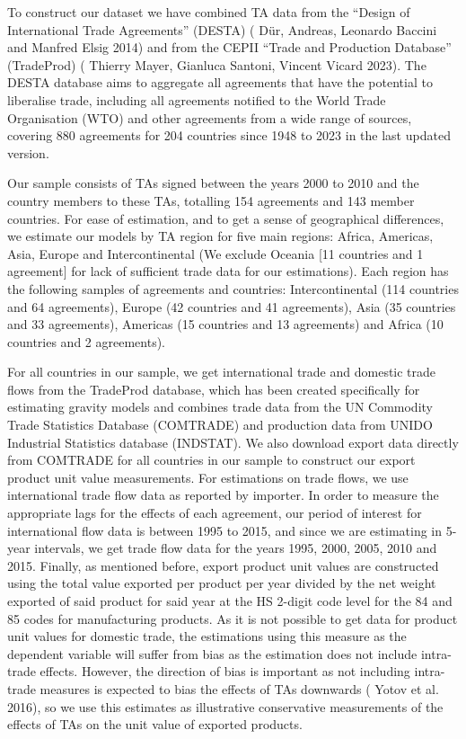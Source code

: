 To construct our dataset we have combined TA data from the ``Design of
International Trade Agreements'' (DESTA) (\cite{dur_andreas_leonardo_baccini_and_manfred_elsig_design_2014} Dür, Andreas, Leonardo Baccini
and Manfred Elsig 2014) and from the CEPII ``Trade and Production
Database'' (TradeProd) (\cite{thierry_mayer_gianluca_santoni_vincent_vicard_cepii_2023} Thierry Mayer, Gianluca Santoni, Vincent Vicard
2023). The DESTA database aims to aggregate all agreements that have the
potential to liberalise trade, including all agreements notified to the
World Trade Organisation (WTO) and other agreements from a wide range of
sources, covering 880 agreements for 204 countries since 1948 to 2023 in
the last updated version.

Our sample consists of TAs signed between the years 2000 to 2010 and the
country members to these TAs, totalling 154 agreements and 143 member
countries. For ease of estimation, and to get a sense of geographical
differences, we estimate our models by TA region for five main regions:
Africa, Americas, Asia, Europe and Intercontinental (We exclude Oceania
{[}11 countries and 1 agreement{]} for lack of sufficient trade data for
our estimations). Each region has the following samples of agreements
and countries: Intercontinental (114 countries and 64 agreements),
Europe (42 countries and 41 agreements), Asia (35 countries and 33
agreements), Americas (15 countries and 13 agreements) and Africa (10
countries and 2 agreements).

For all countries in our sample, we get international trade and domestic
trade flows from the TradeProd database, which has been created
specifically for estimating gravity models and combines trade data from
the UN Commodity Trade Statistics Database (COMTRADE) and production
data from UNIDO Industrial Statistics database (INDSTAT). We also
download export data directly from COMTRADE for all countries in our
sample to construct our export product unit value measurements. For
estimations on trade flows, we use international trade flow data as
reported by importer. In order to measure the appropriate lags for the
effects of each agreement, our period of interest for international flow
data is between 1995 to 2015, and since we are estimating in 5-year
intervals, we get trade flow data for the years 1995, 2000, 2005, 2010
and 2015. Finally, as mentioned before, export product unit values are
constructed using the total value exported per product per year divided
by the net weight exported of said product for said year at the HS
2-digit code level for the 84 and 85 codes for manufacturing products.
As it is not possible to get data for product unit values for domestic
trade, the estimations using this measure as the dependent variable will
suffer from bias as the estimation does not include intra-trade effects.
However, the direction of bias is important as not including intra-trade
measures is expected to bias the effects of TAs downwards (\cite{yotov_advanced_2016} Yotov et al.
2016), so we use this estimates as illustrative conservative
measurements of the effects of TAs on the unit value of exported
products.